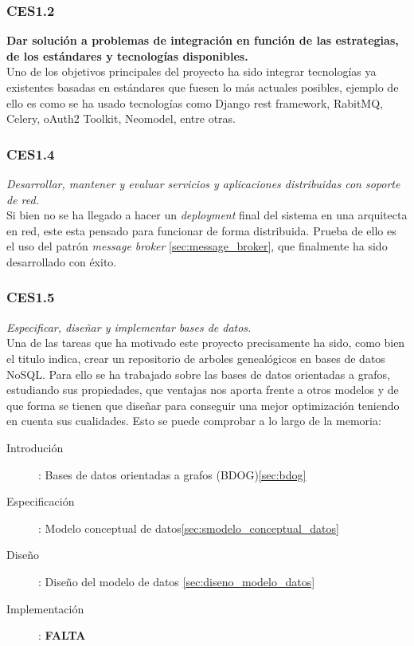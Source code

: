 \subsubsection{CES1.2}
\textbf{Dar solución a problemas de integración en función de las estrategias, de los estándares y tecnologías disponibles.}\\
Uno de los objetivos principales del proyecto ha sido integrar tecnologías ya existentes basadas en estándares que fuesen lo más actuales posibles, ejemplo de ello es como se ha usado tecnologías como Django rest framework, RabitMQ, Celery, oAuth2 Toolkit, Neomodel, entre otras.

\subsubsection{CES1.4}
\textit{Desarrollar, mantener y evaluar servicios y aplicaciones distribuidas con soporte de red.}\\
Si bien no se ha llegado a hacer un \textit{deployment} final del sistema en una arquitecta en red, este esta pensado para funcionar de forma distribuida. Prueba de ello es el uso del patrón \textit{message broker} \ref{sec:message_broker}, que finalmente ha sido desarrollado con éxito.

\subsubsection{CES1.5}
\textit{Especificar, diseñar y implementar bases de datos.}\\
Una de las tareas que ha motivado este proyecto precisamente ha sido, como bien el titulo indica, crear un repositorio de arboles genealógicos en bases de datos NoSQL. Para ello se ha trabajado sobre las bases de datos orientadas a grafos, estudiando sus propiedades, que ventajas nos aporta frente a otros modelos y de que forma se tienen que diseñar para conseguir una mejor optimización teniendo en cuenta sus cualidades. Esto se puede comprobar a lo largo de la memoria:
\begin{description}
\item[Introdución]: Bases de datos orientadas a grafos (BDOG)\ref{sec:bdog}
\item[Especificación]: Modelo conceptual de datos\ref{sec:smodelo_conceptual_datos}
\item[Diseño]: Diseño del modelo de datos \ref{sec:diseno_modelo_datos}
\item[Implementación]: \textbf{FALTA}
\end{description}

